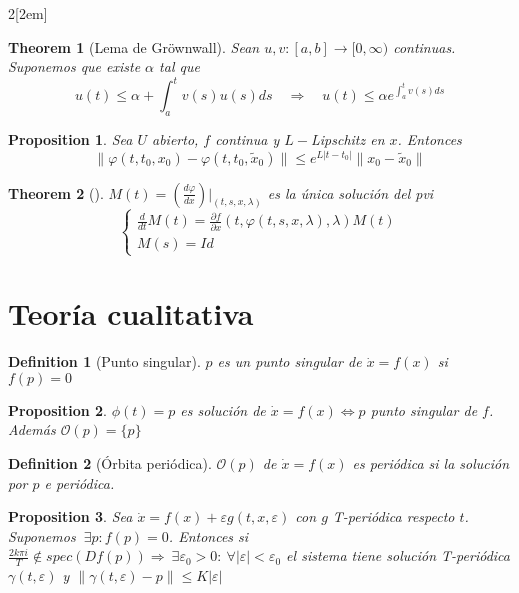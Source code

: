 \documentclass[leqno]{article}
\newtheorem*{definition}{Definition}
\newtheorem*{theorem}{Theorem}
\newtheorem*{proposition}{Proposition}
\begin{document}
\begin{multicols}{2}[\columnsep2em]
\begin{theorem}[Lema de Gröwnwall]
Sean $u, v: [a,b]\to [0, \infty)$ continuas. Suponemos que existe $\alpha $ tal que
\[
u(t) \le \alpha + \int_{a}^t v(s)u(s)ds \quad \Rightarrow \quad u(t) \le \alpha e^{\int_a^tv(s)ds}
\] 
\end{theorem}

\begin{proposition} Sea $U$ abierto, $f$ continua y $L-$Lipschitz en  $x$. Entonces
  \[
  \|\varphi (t, t_0, x_0)-\varphi (t, t_0, \tilde{x}_0)\| \le e^{L|t-t_0|}\|x_0-\tilde{x}_0\|
  \] 
\end{proposition}

\begin{theorem}[] $M(t) = (\frac{d \varphi }{d x} )|_{(t,s,x,\lambda)}$ es la única solución del pvi
\[
  \begin{cases}
\frac{d }{d t} M(t) = \frac{\partial f}{\partial x}(t, \varphi (t,s,x,\lambda), \lambda) M(t)\\
M(s)=Id
  \end{cases}
\] 
\end{theorem}


\section{Teoría cualitativa}
\begin{definition}[Punto singular]
$p$ es un punto singular de $\dot{x}=f(x)$ si $f(p) = 0$
\end{definition}

\begin{proposition}
$\phi(t) = p$ es solución de $\dot{x}=f(x) \iff p$ punto singular de $f$. Además $\mathcal{O}(p)=\{p\}$
\end{proposition}

\begin{definition}[Órbita periódica]
$\mathcal{O}(p)$ de $\dot{x} = f(x)$ es periódica si la solución por $p$ e periódica.
\end{definition}

\begin{proposition}
Sea $\dot{x} = f(x)+ \varepsilon  g(t, x, \varepsilon )$ con $g$ T-periódica respecto  $t$. Suponemos  $\ \exists p: f(p)=0$. Entonces si $ \frac{2k\pi i}{T} \not\in spec(Df(p)) \Rightarrow \ \exists \varepsilon_0 >0 : \ \forall |\varepsilon |<\varepsilon _0$ el sistema tiene solución T-periódica $\gamma (t, \varepsilon )$ y $\|\gamma (t, \varepsilon )-p\|\le K|\varepsilon |$
\end{proposition}


\end{multicols}
\end{document}
